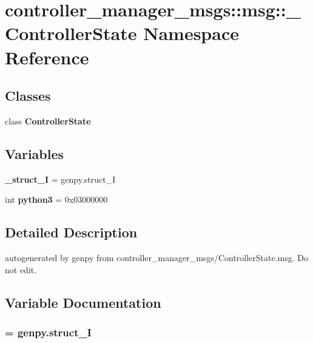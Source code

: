 \section{controller\-\_\-manager\-\_\-msgs\-:\-:msg\-:\-:\-\_\-\-Controller\-State \-Namespace \-Reference}
\label{namespacecontroller__manager__msgs_1_1msg_1_1__ControllerState}
\subsection*{\-Classes}
\begin{DoxyCompactItemize}
\item 
class {\bf \-Controller\-State}
\end{DoxyCompactItemize}
\subsection*{\-Variables}
\begin{DoxyCompactItemize}
\item 
{\bf \-\_\-struct\-\_\-\-I} = genpy.\-struct\-\_\-\-I
\item 
int {\bf python3} = 0x03000000
\end{DoxyCompactItemize}


\subsection{\-Detailed \-Description}
\begin{DoxyVerb}autogenerated by genpy from controller_manager_msgs/ControllerState.msg. Do not edit.\end{DoxyVerb}
 

\subsection{\-Variable \-Documentation}
\subsubsection[{\-\_\-struct\-\_\-\-I}]{ = genpy.\-struct\-\_\-\-I}\label{namespacecontroller__manager__msgs_1_1msg_1_1__ControllerState_a0ac78035ab7efa7f6e55ba45ae27ca0a}


